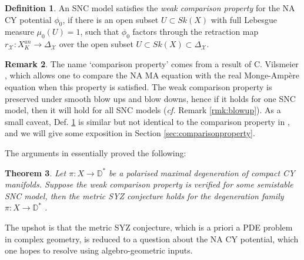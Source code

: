 \documentclass[a4paper]{article}
\newtheorem{thm}{Theorem}[section]
\theoremstyle{definition}
\newtheorem{rmk}[thm]{Remark}
\newtheorem{Def}[thm]{Definition}
\newcommand{\cf}{\emph{cf.} }
\begin{document}
\begin{enumerate}
		\begin{Def}\label{Def:weakcomparison}
	An SNC model satisfies the \emph{weak comparison property} for the NA CY potential $\phi_0$, if there is an open subset $U\subset Sk(X)$ with full Lebesgue measure $\mu_0(U)=1$, such that $\phi_0$ factors through the retraction map $r_{\mathcal{X}}: X_K^{an}\to \Delta_{\mathcal{X}}$ over the open subset $U\subset Sk(X)\subset \Delta_{\mathcal{X}}$. 
		\end{Def}
		
		

		
		
		
		\begin{rmk}
			The name `comparison property' comes from a result of C. Vilsmeier \cite{Vilsmeier}, which allows one to compare the NA MA equation with the real Monge-Amp\`ere equation when 
			this property is satisfied. The weak comparison property is preserved under smooth blow ups and blow downs, hence if it holds for one SNC model, then it will hold for all SNC models (\cf Remark \ref{rmk:blowup}). As a small caveat, Def. \ref{Def:weakcomparison} is similar but not identical to the comparison property in \cite{LiNA}, and we will give some exposition in Section \ref{sec:comparisonproperty}.
		\end{rmk}
		
				The arguments in \cite{LiNA} essentially proved the following:
		
		\begin{thm} \label{thm:comparisonpropertySYZ}
			Let $\pi: X\to \mathbb{D}^*$ be a polarised maximal degeneration of  compact CY manifolds. 
			Suppose the weak comparison property is verified for some semistable SNC model, then the metric SYZ conjecture holds for the degeneration family $\pi: X\to \mathbb{D}^*$ . 
		\end{thm}
		
	\end{enumerate}
	
	
	
	
	
	The upshot is that the metric SYZ conjecture, which is a priori a PDE problem in complex geometry, is reduced to a question about the NA CY potential, which one hopes to resolve using algebro-geometric inputs.
	
	
	
\end{document}
